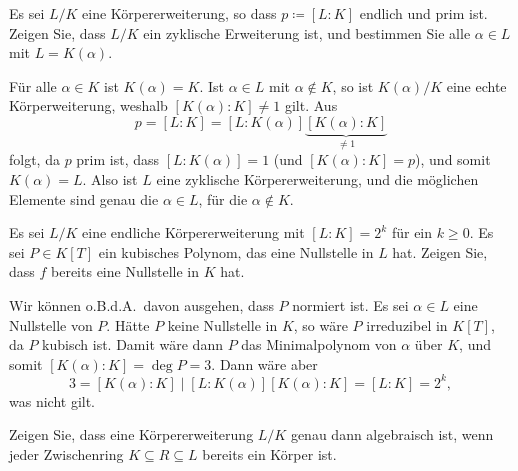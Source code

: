 \begin{question}
  Es sei $L/K$ eine Körpererweiterung, so dass $p \coloneqq [L : K]$ endlich und prim ist.
  Zeigen Sie, dass $L/K$ ein zyklische Erweiterung ist, und bestimmen Sie alle $\alpha \in L$ mit $L = K(\alpha)$.
\end{question}


\begin{solution}
  Für alle $\alpha \in K$ ist $K(\alpha) = K$.
  Ist $\alpha \in L$ mit $\alpha \notin K$, so ist $K(\alpha)/K$ eine echte Körperweiterung, weshalb $[K(\alpha) : K] \neq 1$ gilt.
  Aus
  \[
      p
    = [L : K]
    = [L : K(\alpha)] \underbrace{[K(\alpha) : K]}_{\neq 1}
  \]
  folgt, da $p$ prim ist, dass $[L : K(\alpha)] = 1$ (und $[K(\alpha) : K] = p$), und somit $K(\alpha) = L$.
  Also ist $L$ eine zyklische Körpererweiterung, und die möglichen Elemente sind genau die $\alpha \in L$, für die $\alpha \notin K$.
\end{solution}


\begin{question}
  Es sei $L/K$ eine endliche Körpererweiterung mit $[L : K] = 2^k$ für ein $k \geq 0$.
  Es sei $P \in K[T]$ ein kubisches Polynom, das eine Nullstelle in $L$ hat.
  Zeigen Sie, dass $f$ bereits eine Nullstelle in $K$ hat.
\end{question}


\begin{solution}
  Wir können o.B.d.A.\ davon ausgehen, dass $P$ normiert ist.
  Es sei $\alpha \in L$ eine Nullstelle von $P$.
  Hätte $P$ keine Nullstelle in $K$, so wäre $P$ irreduzibel in $K[T]$, da $P$ kubisch ist.
  Damit wäre dann $P$ das Minimalpolynom von $\alpha$ über $K$, und somit $[K(\alpha) : K] = \deg P = 3$.
  Dann wäre aber
  \[
          3
    =     [K(\alpha) : K]
    \mid  [L : K(\alpha)] [K(\alpha) : K]
    =     [L : K]
    =     2^k,
  \]
  was nicht gilt.
\end{solution}


\begin{question}
  Zeigen Sie, dass eine Körpererweiterung $L/K$ genau dann algebraisch ist, wenn jeder Zwischenring $K \subseteq R \subseteq L$ bereits ein Körper ist.
\end{question}


